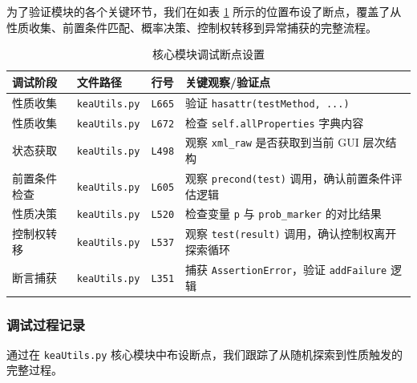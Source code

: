 \documentclass[a4paper, zihao=-4]{ctexart}
\begin{document}
为了验证模块的各个关键环节，我们在如表 \ref{tab:debug_points} 所示的位置布设了断点，覆盖了从性质收集、前置条件匹配、概率决策、控制权转移到异常捕获的完整流程。
\begin{table}[h] 
    \centering 
    \caption{核心模块调试断点设置} 
    \label{tab:debug_points}
    \begin{tabular}{llll} %
        \toprule %
        \textbf{调试阶段} & \textbf{文件路径} & \textbf{行号} & \textbf{关键观察/验证点} \\
        \midrule %
        性质收集     & \texttt{keaUtils.py} & \texttt{L665} & 验证 \texttt{hasattr(testMethod, ...)} \\
        性质收集     & \texttt{keaUtils.py} & \texttt{L672} & 检查 \texttt{self.allProperties} 字典内容 \\
        状态获取     & \texttt{keaUtils.py} & \texttt{L498} & 观察 \texttt{xml\_raw} 是否获取到当前 GUI 层次结构 \\
        前置条件检查 & \texttt{keaUtils.py} & \texttt{L605} & 观察 \texttt{precond(test)} 调用，确认前置条件评估逻辑 \\
        性质决策     & \texttt{keaUtils.py} & \texttt{L520} & 检查变量 \texttt{p} 与 \texttt{prob\_marker} 的对比结果 \\
        控制权转移   & \texttt{keaUtils.py} & \texttt{L537} & 观察 \texttt{test(result)} 调用，确认控制权离开探索循环 \\
        断言捕获     & \texttt{keaUtils.py} & \texttt{L351} & 捕获 \texttt{AssertionError}，验证 \texttt{addFailure} 逻辑 \\
        \bottomrule %
    \end{tabular}
\end{table}

\subsubsection{调试过程记录}

通过在 \texttt{keaUtils.py} 核心模块中布设断点，我们跟踪了从随机探索到性质触发的完整过程。
\end{document}
